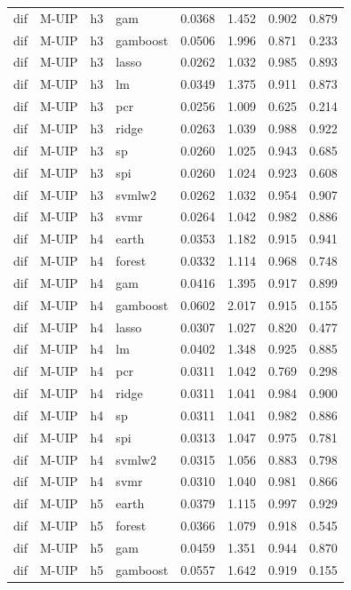 \begin{ThreePartTable}
\begin{longtable}[t]{llclcccc}
dif & M-UIP & h3 & gam & 0.0368 & 1.452 & 0.902 & 0.879\\
dif & M-UIP & h3 & gamboost & 0.0506 & 1.996 & 0.871 & 0.233\\
dif & M-UIP & h3 & lasso & 0.0262 & 1.032 & 0.985 & 0.893\\
dif & M-UIP & h3 & lm & 0.0349 & 1.375 & 0.911 & 0.873\\
dif & M-UIP & h3 & pcr & 0.0256 & 1.009 & 0.625 & 0.214\\
dif & M-UIP & h3 & ridge & 0.0263 & 1.039 & 0.988 & 0.922\\
dif & M-UIP & h3 & sp & 0.0260 & 1.025 & 0.943 & 0.685\\
dif & M-UIP & h3 & spi & 0.0260 & 1.024 & 0.923 & 0.608\\
dif & M-UIP & h3 & svmlw2 & 0.0262 & 1.032 & 0.954 & 0.907\\
dif & M-UIP & h3 & svmr & 0.0264 & 1.042 & 0.982 & 0.886\\
\addlinespace
dif & M-UIP & h4 & earth & 0.0353 & 1.182 & 0.915 & 0.941\\
dif & M-UIP & h4 & forest & 0.0332 & 1.114 & 0.968 & 0.748\\
dif & M-UIP & h4 & gam & 0.0416 & 1.395 & 0.917 & 0.899\\
dif & M-UIP & h4 & gamboost & 0.0602 & 2.017 & 0.915 & 0.155\\
dif & M-UIP & h4 & lasso & 0.0307 & 1.027 & 0.820 & 0.477\\
dif & M-UIP & h4 & lm & 0.0402 & 1.348 & 0.925 & 0.885\\
dif & M-UIP & h4 & pcr & 0.0311 & 1.042 & 0.769 & 0.298\\
dif & M-UIP & h4 & ridge & 0.0311 & 1.041 & 0.984 & 0.900\\
dif & M-UIP & h4 & sp & 0.0311 & 1.041 & 0.982 & 0.886\\
dif & M-UIP & h4 & spi & 0.0313 & 1.047 & 0.975 & 0.781\\
dif & M-UIP & h4 & svmlw2 & 0.0315 & 1.056 & 0.883 & 0.798\\
dif & M-UIP & h4 & svmr & 0.0310 & 1.040 & 0.981 & 0.866\\
\addlinespace
dif & M-UIP & h5 & earth & 0.0379 & 1.115 & 0.997 & 0.929\\
dif & M-UIP & h5 & forest & 0.0366 & 1.079 & 0.918 & 0.545\\
dif & M-UIP & h5 & gam & 0.0459 & 1.351 & 0.944 & 0.870\\
dif & M-UIP & h5 & gamboost & 0.0557 & 1.642 & 0.919 & 0.155\\

\end{longtable}
\end{ThreePartTable}
